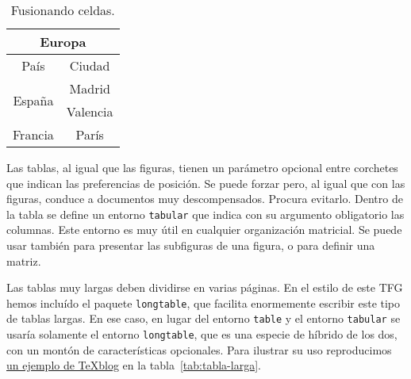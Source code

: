 \begin{table}[htb] 
\centering
\begin{tabular}{|c|c|}
\hline
\multicolumn{2}{|c|}{Europa} \\
\hline
País  & Ciudad \\ \hline \hline
\multirow{2}{1.1cm}{España} & Madrid \\ \cline{2-2}
& Valencia \\ \hline
Francia & París \\ \hline
\end{tabular}
\caption{Fusionando celdas.}
\label{tab:dificililla}
\end{table}

Las tablas, al igual que las figuras, tienen un parámetro opcional entre corchetes que indican las preferencias de posición.  Se puede forzar pero, al igual que con las figuras, conduce a documentos muy descompensados.  Procura evitarlo.  Dentro de la tabla se define un entorno \texttt{tabular} que indica con su argumento obligatorio las columnas.  Este entorno es muy útil en cualquier organización matricial.  Se puede usar también para presentar las subfiguras de una figura, o para definir una matriz.

Las tablas muy largas deben dividirse en varias páginas.  En el estilo de este TFG hemos incluído el paquete \texttt{longtable}, que facilita enormemente escribir este tipo de tablas largas.  En ese caso, en lugar del entorno \texttt{table} y el entorno \texttt{tabular} se usaría solamente el entorno \texttt{longtable}, que es una especie de híbrido de los dos, con un montón de características opcionales.  Para ilustrar su uso reproducimos \href{https://texblog.org/2011/05/15/multi-page-tables-using-longtable/}{un ejemplo de TeXblog} en la tabla~\ref{tab:tabla-larga}.

